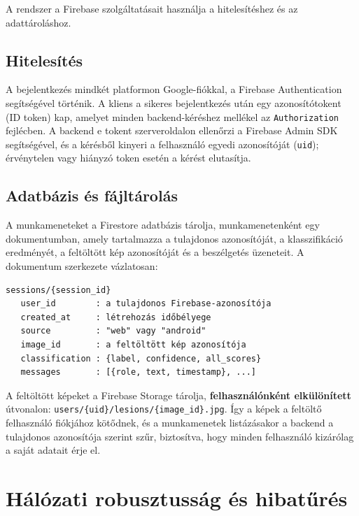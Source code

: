 A rendszer a Firebase szolgáltatásait \cite{firebase} használja a
hitelesítéshez és az adattároláshoz.

\subsection{Hitelesítés}

A bejelentkezés mindkét platformon Google-fiókkal, a Firebase Authentication
segítségével történik. A kliens a sikeres bejelentkezés után egy
azonosító\-tokent (ID token) kap, amelyet minden backend-kéréshez mellékel az
\texttt{Authorization} fejlécben. A backend e tokent szerveroldalon ellenőrzi a
Firebase Admin SDK segítségével, és a kérésből kinyeri a felhasználó egyedi
azonosítóját (\texttt{uid}); érvénytelen vagy hiányzó token esetén a kérést
elutasítja.

\subsection{Adatbázis és fájltárolás}

A munkameneteket a Firestore adatbázis tárolja, munkamenetenként egy
dokumentumban, amely tartalmazza a tulajdonos azonosítóját, a klasszifikáció
eredményét, a feltöltött kép azonosítóját és a beszélgetés üzeneteit. A
dokumentum szerkezete vázlatosan:

\begin{verbatim}
sessions/{session_id}
   user_id        : a tulajdonos Firebase-azonosítója
   created_at     : létrehozás időbélyege
   source         : "web" vagy "android"
   image_id       : a feltöltött kép azonosítója
   classification : {label, confidence, all_scores}
   messages       : [{role, text, timestamp}, ...]
\end{verbatim}

A feltöltött képeket a Firebase Storage tárolja, \textbf{felhasználónként
elkülönített} útvonalon: \texttt{users/\{uid\}/lesions/\{image\_id\}.jpg}. Így a
képek a feltöltő felhasználó fiókjához kötődnek, és a munkamenetek listázásakor a
backend a tulajdonos azonosítója szerint szűr, biztosítva, hogy minden
felhasználó kizárólag a saját adatait érje el.

\section{Hálózati robusztusság és hibatűrés}

